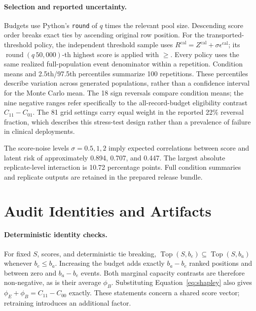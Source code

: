 \documentclass{article}
\newcommand{\topset}{\operatorname{Top}}
\begin{document}
\paragraph{Selection and reported uncertainty.}
Budgets use Python's \texttt{round} of $q$ times the relevant pool size.
Descending score order breaks exact ties by ascending original row position.
For the transported-threshold policy, the independent threshold sample uses
$R^{\mathrm{cal}}=Z^{\mathrm{cal}}+\sigma\epsilon^{\mathrm{cal}}$; its
$\operatorname{round}(q\,50{,}000)$-th highest score is applied with $\geq$.
Every policy uses the same realized full-population event denominator within a
repetition. Condition means and 2.5th/97.5th percentiles summarize 100
repetitions. These percentiles describe variation across generated populations,
rather than a confidence interval for the Monte Carlo mean.
The 18 sign reversals compare condition means; the nine negative ranges refer
specifically to the all-record-budget eligibility contrast $C_{11}-C_{01}$.
The 81 grid settings carry equal weight in the reported 22\% reversal fraction,
which describes this stress-test design rather than a prevalence of failure
in clinical deployments.

The score-noise levels $\sigma=0.5,1,2$ imply expected correlations between
score and latent risk of approximately 0.894, 0.707, and 0.447. The largest
absolute replicate-level interaction is 10.72 percentage points. Full
condition summaries and replicate outputs are retained in the prepared release
bundle.

\section{Audit Identities and Artifacts}
\label{app:reproducibility}

\paragraph{Deterministic identity checks.}
For fixed $S$, scores, and deterministic tie breaking,
$\topset(S,b_e)\subseteq\topset(S,b_a)$ whenever $b_e\leq b_a$. Increasing the
budget adds exactly $b_a-b_e$ ranked positions and between zero and
$b_a-b_e$ events. Both marginal capacity contrasts are therefore non-negative,
as is their average $\phi_B$. Substituting Equation~\ref{eq:shapley} also gives
$\phi_E+\phi_B=C_{11}-C_{00}$ exactly. These statements concern a shared score
vector; retraining introduces an additional factor.
\end{document}
